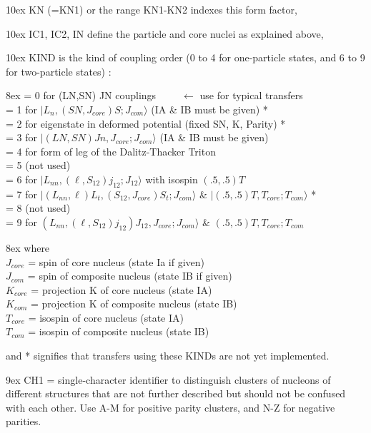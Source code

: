 \documentclass[11pt]{article}
\begin{document}
\hangindent 10ex
KN (=KN1) or the range KN1-KN2 indexes this form factor,

\hangindent 10ex
IC1, IC2, IN define the particle and core nuclei as explained above,

\hangindent 10ex
KIND is the kind of coupling order (0 to 4 for one-particle states, and
6 to 9 for two-particle states) :

\hangindent 8ex
= 0 for (LN,SN) JN couplings   ~ ~ ~$\leftarrow$ use for typical transfers\\
= 1 for $|L_{n}, (SN,J_{core})S ; J_{com}\rangle$  (IA \& IB must be given) *\\
= 2 for eigenstate in deformed potential (fixed SN, K, Parity)  *\\
= 3 for $|(LN,SN)Jn, J_{core}; J_{com}\rangle$    (IA \& IB must be given)\\
= 4 for form of leg of the Dalitz-Thacker Triton\\
= 5  (not used)\\
= 6 for $|L_{nn}, (\ell,S_{12})j_{12}; J_{12}\rangle$  with isospin $(.5,.5) T$\\
= 7 for $|(L_{nn},\ell)L_t, (S_{12},J_{core})S_t ;  J_{com}\rangle$ \& $|(.5,.5)T,T_{core};T_{com}\rangle$  *\\
= 8  (not used)\\
= 9 for $(L_{nn},(\ell,S_{12})j_{12})J_{12}, J_{core}; J_{com}\rangle$ \&
$(.5,.5)T,T_{core};T_{com}$

\hangindent 8ex  where
\\  $J_{core}$ = spin of core nucleus (state Ia if given)
\\  $J_{com}$  = spin of composite nucleus (state IB if given)
\\  $K_{core}$ = projection K of core nucleus (state IA)
\\  $K_{com}$  = projection K of composite nucleus (state IB)
\\  $T_{core}$ = isospin of core nucleus (state IA)
\\  $T_{com}$  = isospin of composite nucleus (state IB)


and  *  signifies that transfers using these KINDs are not yet implemented.
\bigskip


\hangindent 9ex
CH1 = single-character identifier to distinguish clusters of
nucleons of different structures that are not further described
but should not be confused with each other.
Use A-M for positive parity clusters, and N-Z for negative parities.
\end{document}
